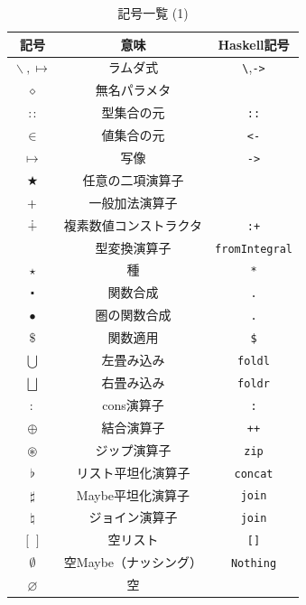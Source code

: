 \documentclass[a5paper,twoside,fleqn,draft]{jsbook}
\newcommand{\programminglanguage}[1]{\textsf{#1}}
\newcommand{\haskell}{\programminglanguage{Haskell}}
\newcommand{\code}[1]{\texttt{#1}}
\newcommand{\mEmptyList}{{[\,]}}
\newcommand{\mNothing}{\emptyset}
\newcommand{\mPureNothing}{\varnothing}
\newcommand{\mAnonParam}{\diamond}
\newcommand{\mUpCast}{\bigtriangleup}
\DeclareMathOperator{\mFromIntegral}{\mUpCast_\text{Integral}}
\DeclareMathOperator{\mAppend}{\oplus}
\DeclareMathOperator{\mApply}{\$}
\DeclareMathOperator{\mApplyRight}{\rightsquigarrow}
\DeclareMathOperator{\mBinOp}{\bigstar}
\DeclareMathOperator{\mComp}{\centerdot}
\DeclareMathOperator{\mCompCat}{\bullet}
\DeclareMathOperator{\mComplexPlus}{\dotplus}
\DeclareMathOperator*{\mFold}{\bigcup}
\DeclareMathOperator*{\mFoldRight}{\bigsqcup}
\DeclareMathOperator{\mFuncArrow}{\mapsto}
\DeclareMathOperator{\mIn}{{:\!:}}
\DeclareMathOperator{\mJoin}{\natural}
\DeclareMathOperator{\mJoinList}{\flat} %
\DeclareMathOperator{\mJoinMaybe}{\sharp}
\DeclareMathOperator{\mLambda}{\backslash}
\DeclareMathOperator{\mLambdaArrow}{\mapsto}
\DeclareMathOperator{\mPlus}{\boldmath{+}} %
\DeclareMathOperator{\mUnOp}{\star}
\DeclareMathOperator{\mZip}{\circledast}
\begin{document}
\begin{table}[p]
\caption{記号一覧 (1)}
\begin{center}
\begin{tabular}{||c|c|c||}
\hline
記号&意味&\haskell 記号\\
\hline\hline
$\mLambda, \mLambdaArrow$&ラムダ式&\code{\textbackslash},\code{->}\\
$\mAnonParam$&無名パラメタ&\\
\hline
$\mIn$&型集合の元&\code{::}\\
$\in$&値集合の元&\code{<-}\\
$\mFuncArrow$&写像&\code{->}\\
\hline
$\mBinOp$&任意の二項演算子&\\
$\mPlus$&一般加法演算子&\\
\hline
$\mComplexPlus$&複素数値コンストラクタ&\code{:+}\\
\hline
$\mFromIntegral$&型変換演算子&\code{fromIntegral}\\
$\star$&種&\code{*}\\
\hline
$\mComp$&関数合成&\code{.}\\
$\mCompCat$&圏の関数合成&\code{.}\\
$\mApply$&関数適用&\code{\$}\\
\hline
$\mFold$&左畳み込み&\code{foldl}\\
$\mFoldRight$&右畳み込み&\code{foldr}\\
\hline
$:$&cons演算子&\code{:}\\
$\mAppend$&結合演算子&\code{++}\\
$\mZip$&ジップ演算子&\code{zip}\\
\hline
$\mJoinList$&リスト平坦化演算子&\code{concat}\\
$\mJoinMaybe$&Maybe平坦化演算子&\code{join}\\
$\mJoin$&ジョイン演算子&\code{join}\\
\hline
$\mEmptyList$&空リスト&\code{[]}\\
$\mNothing$&空Maybe（ナッシング）&\code{Nothing}\\
$\mPureNothing$&空&\\
\hline
\end{tabular}
\end{center}
\end{table}
\end{document}
